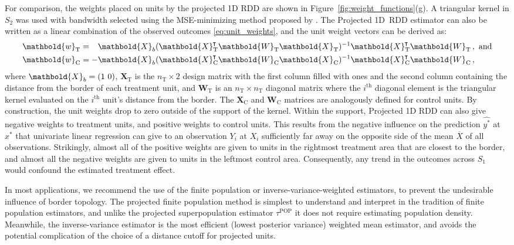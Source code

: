 \documentclass[letter]{article}
\DeclarePairedDelimiter{\parenthesis}{\lparen}{\rparen}
\newcommand{\del}[1]{\parenthesis*{#1}}
\newcommand*{\trans}{^{\mkern-1.5mu\intercal}}
\newcommand{\treat}{\mathrm{T}}
\newcommand{\ctrol}{\mathrm{C}}
\newcommand{\wvec}{\mathbold{w}}
\newcommand{\taupop}{\tau^{\mathrm{POP}}}
\newcommand{\eqlabel}[1]{\label{#1}}
\newcommand{\wt}{\wvec_{\treat}}
\newcommand{\wc}{\wvec_{\ctrol}}
\newcommand{\Xmat}{\mathbold{X}}
\newcommand{\Wmat}{\mathbold{W}}
\renewcommand{\cite}[1]{\citet{#1}}
\begin{document}
    	For comparison, the weights placed on units by the projected 1D RDD are shown in Figure~\ref{fig:weight_functions}(g).
A triangular kernel in \(S_2\) was used with bandwidth selected using the MSE-minimizing method proposed by \cite{imbens2012optimal}.
The Projected 1D~RDD estimator can also be written as a linear combination of the observed outcomes \eqref{eq:unit_weights}, and the unit weight vectors can be derived as:
\begin{equation}
\begin{split}
\wt &= \hphantom{-} \Xmat_b (\Xmat_\treat\trans \Wmat_\treat \Xmat_\treat)^{-1} \Xmat_\treat\trans \Wmat_\treat \,, 
\text{ and}
\\
\wc &= - \Xmat_b (\Xmat_\ctrol\trans \Wmat_\ctrol \Xmat_\ctrol)^{-1} \Xmat_\ctrol\trans \Wmat_\ctrol \,, 
\end{split}
\eqlabel{eq:unit_weights_llr}
\end{equation}
where \(\Xmat_b = \del{1~0}\), \(\Xmat_\treat\) is the \(n_\treat \times 2\) design matrix with the first column filled with ones and the second column containing the distance from the border of each treatment unit, and \(\Wmat_\treat\) is an \(n_\treat \times n_\treat\) diagonal matrix where the \(i^\mathrm{th}\) diagonal element is the triangular kernel evaluated on the \(i^\mathrm{th}\) unit's distance from the border.
The \(\Xmat_\ctrol\) and \(\Wmat_\ctrol\) matrices are analogously defined for control units.
By construction, the unit weights drop to zero outside of the support of the kernel.
Within the support, Projected 1D RDD can also give negative weights to treatment units, and positive weights to control units.
This results from the negative influence on the prediction \(\widehat{y^*}\) at \(x^*\) that univariate linear regression can give to an observation \(Y_i\) at \(X_i\) sufficiently far away on the opposite side of the mean \(\overline{X}\) of all observations.
Strikingly, almost all of the positive weights are given to units in the rightmost treatment area that are closest to the border, and almost all the negative weights are given to units in the leftmost control area.
Consequently, any trend in the outcomes across \(S_1\) would confound the estimated treatment effect.

In most applications, we recommend the use of the finite population or inverse-variance-weighted estimators, to prevent the undesirable influence of border topology.
The projected finite population method is simplest to understand and interpret in the tradition of finite population estimators, and unlike the projected superpopulation estimator \(\taupop\) it does not require estimating population density.
Meanwhile, the inverse-variance estimator is the most efficient (lowest posterior variance) weighted mean estimator,
and avoids the potential complication of the choice of a distance cutoff for projected units.
    
\end{document}
